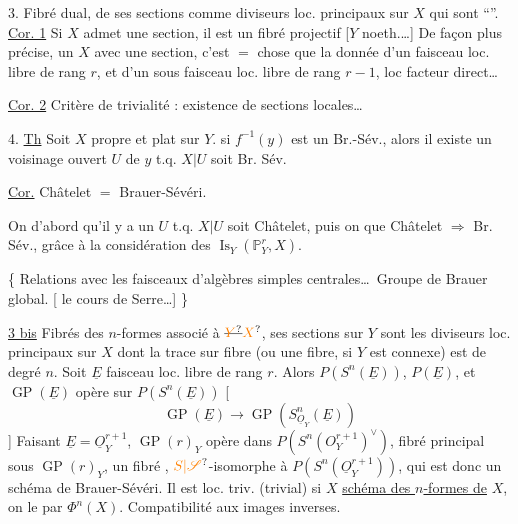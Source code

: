 3. Fibré dual,  de ses sections comme diviseurs loc. principaux sur $X$ qui sont ``''. \uline{Cor. 1} Si $X$ admet une section, il est un fibré projectif [$Y$ noeth.\ldots] De façon plus précise, un $X$  avec une section, c'est  $=$ chose que la donnée d'un  faisceau loc. libre de rang $r$, et d'un sous faisceau loc. libre de rang $r-1$, loc facteur direct\ldots

\uline{Cor. 2}  Critère de  trivialité : existence de sections locales\ldots

4. \uline{Th} Soit $X$ propre et plat sur $Y$.  si $f^{-1}(y)$ est un Br.-Sév., alors il existe un voisinage ouvert $U$ de $y$ t.q. $X|U$ soit Br. Sév.

\uline{Cor.} Châtelet $=$ Brauer-Sévéri.

On  d'abord qu'il y a un $U$ t.q. $X|U$ soit Châtelet, puis on   que Châtelet $\Rightarrow$ Br. Sév., grâce à la considération des $\operatorname{Is}_{Y}(\mathbb{P}^{r}_{Y},X)$.

\{ Relations avec les faisceaux d'algèbres simples centrales\ldots\ Groupe de Brauer global. [ le cours de Serre\ldots] \}

\uline{3 bis} Fibrés des $n$-formes associé à $\deleted{\unsure{Y}}\unsure{X}$, ses sections sur $Y$ sont les diviseurs loc. principaux sur $X$ dont la trace sur  fibre (ou une fibre, si $Y$ est connexe) est de degré $n$.
Soit $\underline{E}$ faisceau loc. libre de rang $r$. Alors  $P(S^n(\underline{E}))$,   $P(\underline{E})$,  et $\operatorname{GP}(\underline{E})$ opère sur $P(S^n(\underline{E}))$   [
\[
\operatorname{GP}(\underline{E})\longrightarrow\operatorname{GP}(S^n_{\underline{O}_{Y}}(\underline{E}))
\]
] Faisant $\underline{E}=\underline{O}_{Y}^{r+1}$,  $\operatorname{GP}(r)_{Y}$ opère dans $P(S^n(O_{Y}^{r+1})^{\vee})$,   fibré principal  sous $\operatorname{GP}(r)_{Y}$,  un fibré  , $\unsure{S|\mathscr{S}}$-isomorphe à $P(S^n(\underline{O}_{Y}^{r+1}))$, qui est donc un schéma de Brauer-Sévéri. Il est loc. triv. (trivial) si $X$   \uline{schéma des $n$-formes de} $X$, on le  par $\Phi^n(X)$. Compatibilité aux images inverses.

